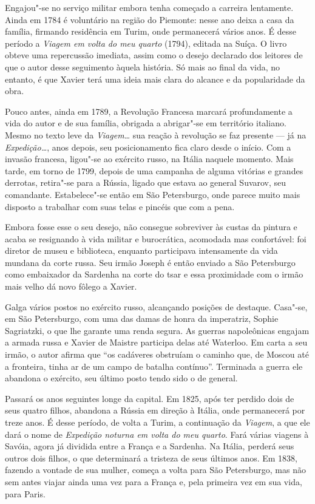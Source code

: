 Engajou"-se no serviço militar embora tenha começado a carreira
lentamente. Ainda em 1784 é voluntário na região do Piemonte: nesse ano
deixa a casa da família, firmando residência em Turim, onde permanecerá
vários anos. É desse período a \textit{Viagem em volta do meu quarto}
(1794), editada na Suíça. O livro obteve uma repercussão imediata,
assim como o desejo declarado dos leitores de que o autor desse
seguimento àquela história. Só mais ao final da vida, no entanto, é que
Xavier terá uma ideia mais clara do alcance e da popularidade da obra. 

Pouco antes, ainda em 1789, a Revolução Francesa marcará profundamente a
vida do autor e de sua família, obrigada a abrigar"-se em território
italiano. Mesmo no texto leve da \textit{Viagem\ldots} sua reação à
revolução se faz presente --- já na \textit{Expedição\ldots}, anos depois,
seu posicionamento fica claro desde o início. Com a invasão francesa,
ligou"-se ao exército russo, na Itália naquele momento. Mais tarde, em
torno de 1799, depois de uma campanha de alguma vitórias e grandes
derrotas, retira"-se para a Rússia, ligado que estava ao general
Suvarov, seu comandante. Estabelece"-se então em São Petersburgo, onde
parece muito mais disposto a trabalhar com suas telas e pincéis que com
a pena.

Embora fosse esse o seu desejo, não consegue sobreviver às custas da
pintura e acaba se resignando à vida militar e burocrática, acomodada
mas confortável: foi diretor de museu e biblioteca, enquanto
participava intensamente da vida mundana da corte russa. Seu irmão
Joseph é então enviado a São Petersburgo como embaixador da Sardenha na
corte do tsar e essa proximidade com o irmão mais velho dá novo fôlego
a Xavier. 

Galga vários postos no exército russo, alcançando posições de destaque.
Casa"-se, em São Petersburgo, com uma das damas de honra da imperatriz,
Sophie Sagriatzki, o que lhe garante uma renda segura. As guerras
napoleônicas engajam a armada russa e Xavier de Maistre participa delas
até Waterloo. Em carta a seu irmão, o autor afirma que ``os cadáveres
obstruíam o caminho que, de Moscou até a fronteira, tinha ar de um
campo de batalha contínuo''.  Terminada a guerra ele abandona o
exército, seu último posto tendo sido o de general. 

Passará os anos seguintes longe da capital. Em 1825, após ter perdido
dois de seus quatro filhos, abandona a Rússia em direção à Itália, onde
permanecerá por treze anos. É desse período, de volta a Turim, a
continuação da \textit{Viagem}, a que ele dará o nome de
\textit{Expedição noturna em volta do meu quarto}. Fará várias viagens
à Savóia, agora já dividida entre a França e a Sardenha. Na Itália,
perderá seus outros dois filhos, o que determinará a tristeza de seus
últimos anos. Em 1838, fazendo a vontade de sua mulher, começa a volta
para São Petersburgo, mas não sem antes viajar ainda uma vez para a
França e, pela primeira vez em sua vida, para Paris. 

